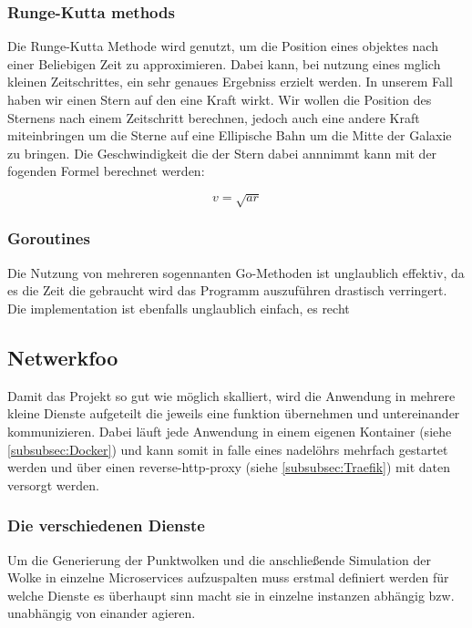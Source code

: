 
\subsubsection{Runge-Kutta methods}
Die Runge-Kutta Methode wird genutzt, um die Position eines objektes nach einer
Beliebigen Zeit zu approximieren. Dabei kann, bei nutzung eines mglich kleinen
Zeitschrittes, ein sehr genaues Ergebniss erzielt werden.  In unserem Fall
haben wir einen Stern auf den eine Kraft wirkt. Wir wollen die Position des
Sternens nach einem Zeitschritt berechnen, jedoch auch eine andere Kraft
miteinbringen um die Sterne auf eine Ellipische Bahn um die Mitte der Galaxie
zu bringen.
Die Geschwindigkeit die der Stern dabei annnimmt kann mit der fogenden Formel
berechnet werden:

\begin{equation}
    v = \sqrt{ar}
\end{equation}

\subsubsection{Goroutines}
Die Nutzung von mehreren sogennanten Go-Methoden ist unglaublich effektiv, da
es die Zeit die gebraucht wird das Programm auszuführen drastisch verringert.
Die implementation ist ebenfalls unglaublich einfach, es recht

\subsection{Netwerkfoo}

Damit das Projekt so gut wie möglich skalliert, wird die Anwendung in mehrere
kleine Dienste aufgeteilt die jeweils eine funktion übernehmen und
untereinander kommunizieren.  Dabei läuft jede Anwendung in einem eigenen
Kontainer (siehe \ref{subsubsec:Docker}) und kann somit in falle eines
nadelöhrs mehrfach gestartet werden und über einen reverse-http-proxy (siehe
\ref{subsubsec:Traefik}) mit daten versorgt werden.

\subsubsection{Die verschiedenen Dienste}
Um die Generierung der Punktwolken und die anschließende Simulation der Wolke
in einzelne Microservices aufzuspalten muss erstmal definiert werden für welche
Dienste es überhaupt sinn macht sie in einzelne instanzen abhängig bzw.
unabhängig von einander agieren.

